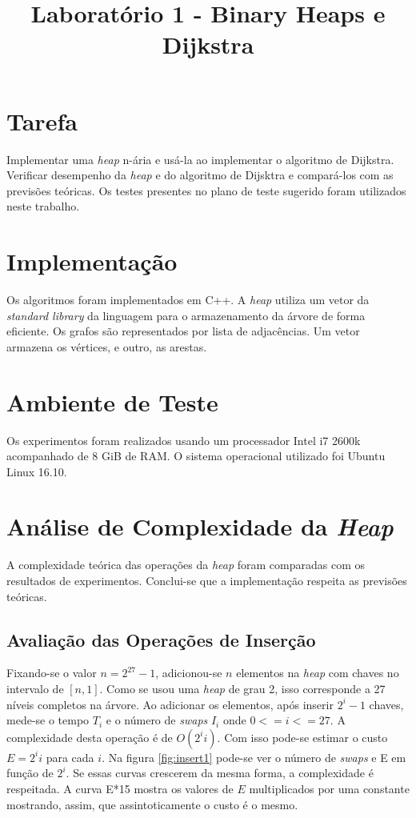 \documentclass{iiufrgs}
\title{Laboratório 1 - Binary Heaps e Dijkstra}
\author{}{Thiago Bell}
\begin{document}
\maketitle

\setcounter{chapter}{1}

\section{Tarefa}
Implementar uma \textit{heap} n-ária e usá-la ao implementar o algoritmo de Dijkstra. 
Verificar desempenho da \textit{heap} e do algoritmo de Dijsktra e compará-los com as previs\~oes teóricas.
Os testes presentes no plano de teste sugerido foram utilizados neste trabalho.

\section{Implementaç\~ao}
Os algoritmos foram implementados em C++. A \textit{heap} utiliza um vetor da \textit{standard library} da linguagem para
o armazenamento da árvore de forma eficiente. Os grafos s\~ao representados
por lista de adjacências. Um vetor armazena os vértices, e outro, as arestas.

\section{Ambiente de Teste}
Os experimentos foram realizados usando um processador Intel i7 2600k acompanhado de 8 GiB de RAM. 
O sistema operacional utilizado foi Ubuntu Linux 16.10.

\section{Análise de Complexidade da \textit{Heap}}
A complexidade teórica das operaç\~oes da \textit{heap} foram comparadas com os resultados de experimentos.
Conclui-se que a implementaç\~ao respeita as previs\~oes teóricas.

\subsection{Avaliaç\~ao das Operaç\~oes de Inserç\~ao}
Fixando-se o valor $n = 2^{27}-1$, adicionou-se $n$ elementos na \textit{heap} com chaves no intervalo de $[n,1]$.  
Como se usou uma \textit{heap} de grau 2, isso corresponde a 27 níveis completos na árvore. 
Ao adicionar os elementos, após inserir $2^{i}-1$ chaves, mede-se o tempo $T_i$ e o número de \textit{swaps} 
$I_i$ onde $0<=i<=27$. A complexidade desta operação é de $O(2^i  i)$.
Com isso pode-se estimar o custo $E = 2^i i$ para cada $i$. Na figura \ref{fig:insert1}
pode-se ver o número de \textit{swaps} e E em funç\~ao de $2^i$. Se essas curvas crescerem da mesma forma,
a complexidade é respeitada. A curva E*15 mostra os valores de $E$ multiplicados por
uma constante mostrando, assim, que assintoticamente o custo é o mesmo.
\end{document}
